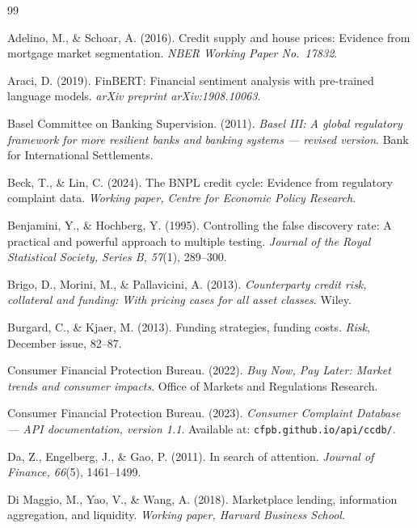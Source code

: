 \documentclass[11pt,a4paper]{article}
\begin{document}
\begin{thebibliography}{99}\setlength{\itemsep}{2pt}

Adelino, M., \& Schoar, A. (2016).
Credit supply and house prices: Evidence from mortgage market segmentation.
\textit{NBER Working Paper No.~17832}.

Araci, D. (2019).
FinBERT: Financial sentiment analysis with pre-trained language models.
\textit{arXiv preprint arXiv:1908.10063}.

Basel Committee on Banking Supervision. (2011).
\textit{Basel III: A global regulatory framework for more resilient banks and banking systems --- revised version}.
Bank for International Settlements.

Beck, T., \& Lin, C. (2024).
The BNPL credit cycle: Evidence from regulatory complaint data.
\textit{Working paper, Centre for Economic Policy Research}.

Benjamini, Y., \& Hochberg, Y. (1995).
Controlling the false discovery rate: A practical and powerful approach to multiple testing.
\textit{Journal of the Royal Statistical Society, Series B, 57}(1), 289--300.

Brigo, D., Morini, M., \& Pallavicini, A. (2013).
\textit{Counterparty credit risk, collateral and funding: With pricing cases for all asset classes}.
Wiley.

Burgard, C., \& Kjaer, M. (2013).
Funding strategies, funding costs.
\textit{Risk}, December issue, 82--87.

Consumer Financial Protection Bureau. (2022).
\textit{Buy Now, Pay Later: Market trends and consumer impacts}.
Office of Markets and Regulations Research.

Consumer Financial Protection Bureau. (2023).
\textit{Consumer Complaint Database --- API documentation, version 1.1}.
Available at: \texttt{cfpb.github.io/api/ccdb/}.

Da, Z., Engelberg, J., \& Gao, P. (2011).
In search of attention.
\textit{Journal of Finance, 66}(5), 1461--1499.

Di Maggio, M., Yao, V., \& Wang, A. (2018).
Marketplace lending, information aggregation, and liquidity.
\textit{Working paper, Harvard Business School}.


\end{thebibliography}
\end{document}

